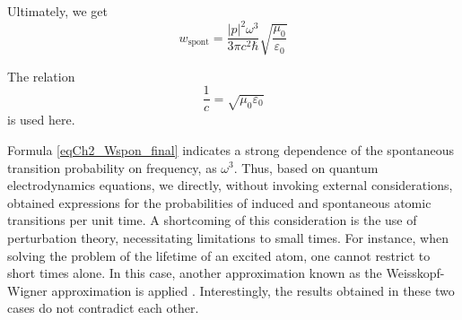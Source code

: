Ultimately, we get
\begin{equation}
w_{\text{spont}} = 
\frac{\left|p\right|^2 \omega^3}
{3 \pi c^2 \hbar}
\sqrt{\frac{\mu_0}{\varepsilon_0}}
\label{eqCh2_Wspon_final}
\end{equation}

The relation 
\[
\frac{1}{c} = \sqrt{\mu_0 \varepsilon_0}
\]
is used here.

Formula \eqref{eqCh2_Wspon_final} indicates a strong dependence of the spontaneous transition probability on frequency, as $\omega^3$. Thus, based on quantum electrodynamics equations, we directly, without invoking external considerations, obtained expressions for the probabilities of induced and spontaneous atomic transitions per unit time. A shortcoming of this consideration is the use of perturbation theory, necessitating limitations to small times. For instance, when solving the problem of the lifetime of an excited atom, one cannot restrict to short times alone. In this case, another approximation known as the Weisskopf-Wigner approximation is applied \cite{bLuisell1972}. Interestingly, the results obtained in these two cases do not contradict each other.
